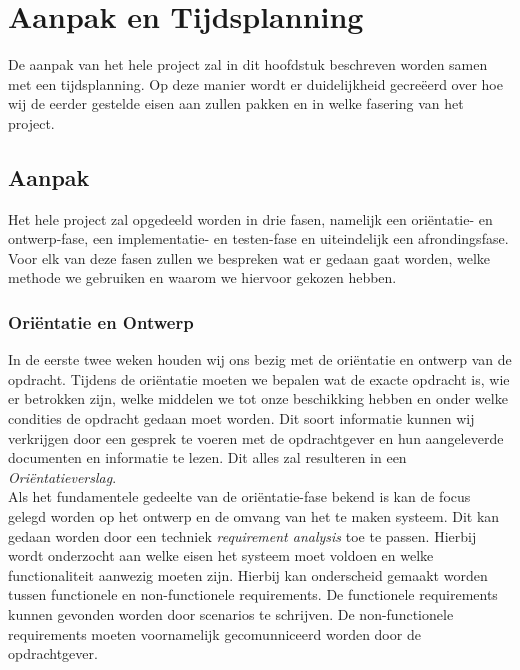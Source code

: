 \section{Aanpak en Tijdsplanning}
De aanpak van het hele project zal in dit hoofdstuk beschreven worden samen met een tijdsplanning. Op deze manier wordt er duidelijkheid gecre\"eerd over hoe wij de eerder gestelde eisen aan zullen pakken en in welke fasering van het project.\\

\subsection{Aanpak}
Het hele project zal opgedeeld worden in drie fasen, namelijk een ori\"entatie- en ontwerp-fase, een implementatie- en testen-fase en uiteindelijk een afrondingsfase. Voor elk van deze fasen zullen we bespreken wat er gedaan gaat worden, welke methode we gebruiken en waarom we hiervoor gekozen hebben.\\

\subsubsection{Ori\"entatie en Ontwerp}
In de eerste twee weken houden wij ons bezig met de ori\"entatie en ontwerp van de opdracht. Tijdens de ori\"entatie moeten we bepalen wat de exacte opdracht is, wie er betrokken zijn, welke middelen we tot onze beschikking hebben en onder welke condities de opdracht gedaan moet worden. Dit soort informatie kunnen wij verkrijgen door een gesprek te voeren met de opdrachtgever en hun aangeleverde documenten en informatie te lezen. Dit alles zal resulteren in een \emph{Ori\"entatieverslag}.\\
Als het fundamentele gedeelte van de ori\"entatie-fase bekend is kan de focus gelegd worden op het ontwerp en de omvang van het te maken systeem. Dit kan gedaan worden door een techniek \emph{requirement analysis} toe te passen. Hierbij wordt onderzocht aan welke eisen het systeem moet voldoen en welke functionaliteit aanwezig moeten zijn. Hierbij kan onderscheid gemaakt worden tussen functionele en non-functionele requirements. De functionele requirements kunnen gevonden worden door scenarios te schrijven. De non-functionele requirements moeten voornamelijk gecomunniceerd worden door de opdrachtgever.\\

